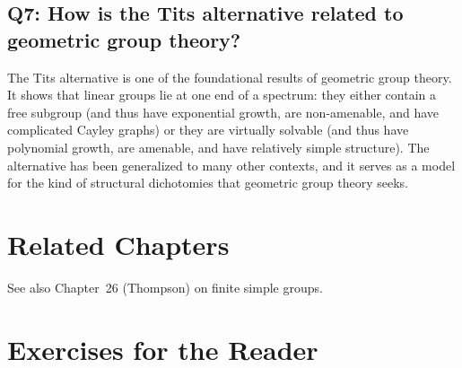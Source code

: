 \subsection*{Q7: How is the Tits alternative related to geometric group theory?}

The Tits alternative is one of the foundational results of geometric group theory. It shows that linear groups lie at one end of a spectrum: they either contain a free subgroup (and thus have exponential growth, are non-amenable, and have complicated Cayley graphs) or they are virtually solvable (and thus have polynomial growth, are amenable, and have relatively simple structure). The alternative has been generalized to many other contexts, and it serves as a model for the kind of structural dichotomies that geometric group theory seeks.

\section{Related Chapters}
See also Chapter~26 (Thompson) on finite simple groups.

\section*{Exercises for the Reader}


